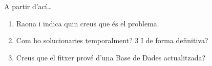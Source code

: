 \documentclass[
  12 pt,
  a4paper,
]{article}
\providecommand{\tightlist}{%
  \setlength{\itemsep}{0pt}\setlength{\parskip}{0pt}}
\begin{document}
A partir d'ací\ldots{}

\begin{enumerate}
\def\labelenumi{\arabic{enumi}.}
\tightlist
\item
  Raona i indica quin creus que és el problema.
\item
  Com ho solucionaries temporalment? 3 I de forma definitiva?
\item
  Creus que el fitxer prové d'una Base de Dades actualitzada?
\end{enumerate}
\end{document}
